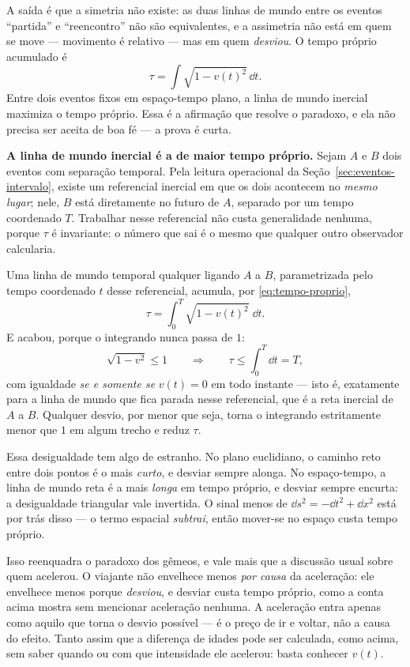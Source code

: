 \documentclass[12pt,a4paper,oneside]{book}
\theoremstyle{rgplain}
\theoremstyle{rgremark}
\begin{document}
A saída é que a simetria não existe: as duas linhas de mundo entre os eventos
``partida'' e ``reencontro'' não são equivalentes, e a assimetria não está em
quem se move --- movimento é relativo --- mas em quem \emph{desviou}. O tempo
próprio acumulado é
\[
  \tau=\int \sqrt{1-v(t)^2}\,\dd t.
\]
Entre dois eventos fixos em espaço-tempo plano, a linha de mundo inercial
maximiza o tempo próprio. Essa é a afirmação que resolve o paradoxo, e ela não
precisa ser aceita de boa fé --- a prova é curta.

\begin{resultado}
\textbf{A linha de mundo inercial é a de maior tempo próprio.} Sejam $A$ e $B$
dois eventos com separação temporal. Pela leitura operacional da
Seção~\ref{sec:eventos-intervalo}, existe um referencial inercial em que os
dois acontecem no \emph{mesmo lugar}; nele, $B$ está diretamente no futuro de
$A$, separado por um tempo coordenado $T$. Trabalhar nesse referencial não
custa generalidade nenhuma, porque $\tau$ é invariante: o número que sai é o
mesmo que qualquer outro observador calcularia.

Uma linha de mundo temporal qualquer ligando $A$ a $B$, parametrizada pelo
tempo coordenado $t$ desse referencial, acumula, por \eqref{eq:tempo-proprio},
\[
  \tau=\int_0^{T}\sqrt{1-v(t)^2}\;\dd t .
\]
E acabou, porque o integrando nunca passa de $1$:
\[
  \sqrt{1-v^2}\le 1
  \qquad\Longrightarrow\qquad
  \tau\le\int_0^T\dd t=T ,
\]
com igualdade \emph{se e somente se} $v(t)=0$ em todo instante --- isto é,
exatamente para a linha de mundo que fica parada nesse referencial, que é a
reta inercial de $A$ a $B$. Qualquer desvio, por menor que seja, torna o
integrando estritamente menor que $1$ em algum trecho e reduz $\tau$.
\end{resultado}

Essa desigualdade tem algo de estranho. No plano euclidiano, o
caminho reto entre dois pontos é o mais \emph{curto}, e desviar sempre alonga.
No espaço-tempo, a linha de mundo reta é a mais \emph{longa} em tempo próprio,
e desviar sempre encurta: a desigualdade triangular vale invertida. O sinal
menos de $\dd s^2=-\dd t^2+\dd x^2$ está por trás disso --- o termo espacial
\emph{subtrai}, então mover-se no espaço custa tempo próprio.

\begin{atencao}
Isso reenquadra o paradoxo dos gêmeos, e vale mais que a discussão usual sobre
quem acelerou. O viajante não envelhece menos \emph{por causa} da aceleração:
ele envelhece menos porque \emph{desviou}, e desviar custa tempo próprio, como
a conta acima mostra sem mencionar aceleração nenhuma. A aceleração entra
apenas como aquilo que torna o desvio possível --- é o preço de ir e voltar,
não a causa do efeito. Tanto assim que a diferença de idades pode ser
calculada, como acima, sem saber quando ou com que intensidade ele acelerou:
basta conhecer $v(t)$.
\end{atencao}
\end{document}
